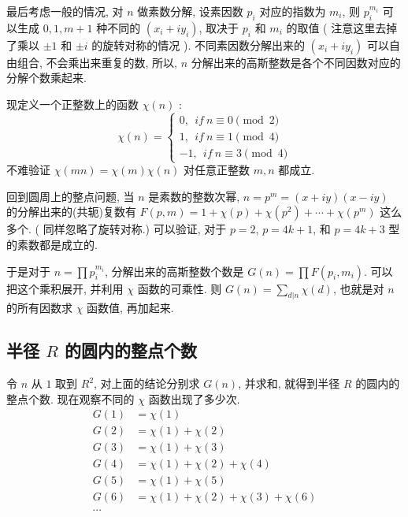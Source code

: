 最后考虑一般的情况, 对 $ n $ 做素数分解, 设素因数 $ p_i $ 对应的指数为 $ m_i $, 则 $ p_i^{m_i} $ 可以生成 $ 0, 1, m+1 $ 种不同的 $(x_i+iy_i)$, 取决于 $ p_i $ 和 $ m_i $ 的取值 ( 注意这里去掉了乘以 $ \pm 1 $ 和 $ \pm i $ 的旋转对称的情况 ). 不同素因数分解出来的 $(x_i+iy_i)$ 可以自由组合, 不会乘出来重复的数, 所以, $ n $ 分解出来的高斯整数是各个不同因数对应的分解个数乘起来.


现定义一个正整数上的函数 $ \chi(n) $ : 
\begin{equation*}
\chi(n) = \begin{cases}
0,\ \ if \ n \equiv 0 \pmod{2}\\
1,\ \ if \ n \equiv 1 \pmod{4}\\
-1,\ \ if \ n \equiv 3 \pmod{4}
\end{cases}
\end{equation*}
不难验证 $ \chi(mn) = \chi(m)\chi(n) $ 对任意正整数 $ m, n $ 都成立.

回到圆周上的整点问题, 当 $ n $ 是素数的整数次幂, $ n=p^m=(x+iy)(x-iy) $ 的分解出来的(共轭)复数有 $ F(p,m) = 1 + \chi(p) + \chi(p^2) + \cdots + \chi(p^m) $ 这么多个. ( 同样忽略了旋转对称.) 可以验证, 对于 $ p = 2 $, $ p = 4k+1 $, 和 $ p=4k+3 $ 型的素数都是成立的. 

于是对于 $ n = \prod{p_i^{m_i}} $, 分解出来的高斯整数个数是 $ G(n) = \prod{F(p_i,m_i)} $. 可以把这个乘积展开, 并利用 $ \chi $ 函数的可乘性. 则 $ G(n) = \sum_{d|n}{\chi(d)} $, 也就是对 $ n $ 的所有因数求 $ \chi $ 函数值, 再加起来. 

\subsection{半径 $ R $ 的圆内的整点个数}
令 $ n $ 从 $ 1 $ 取到 $ R^2 $, 对上面的结论分别求 $ G(n) $, 并求和, 就得到半径 $ R $ 的圆内的整点个数. 现在观察不同的 $ \chi $ 函数出现了多少次.
\begin{align*}
G(1) &= \chi(1) \\
G(2) &= \chi(1) + \chi(2) \\
G(3) &= \chi(1) + \chi(3) \\
G(4) &= \chi(1) + \chi(2) + \chi(4) \\
G(5) &= \chi(1) + \chi(5) \\
G(6) &= \chi(1) + \chi(2) + \chi(3) + \chi(6)\\
\cdots
\end{align*}

